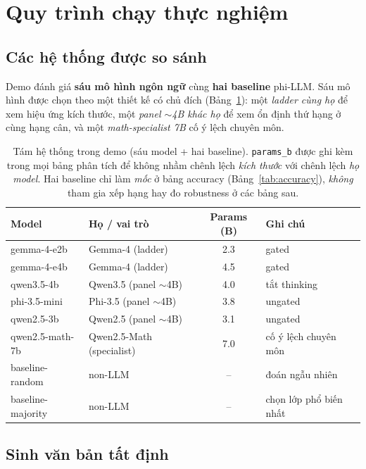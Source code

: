 \section{Quy trình chạy thực nghiệm}
\label{sec:protocol}

\subsection{Các hệ thống được so sánh}

Demo đánh giá \textbf{sáu mô hình ngôn ngữ} cùng \textbf{hai baseline} phi-LLM. Sáu
mô hình được chọn theo một thiết kế có chủ đích (Bảng~\ref{tab:systems}): một
\emph{ladder cùng họ} để xem hiệu ứng kích thước, một \emph{panel $\sim$4B khác họ}
để xem ổn định thứ hạng ở cùng hạng cân, và một \emph{math-specialist 7B} cố ý lệch
chuyên môn.

\begin{table}[t]
\centering
\caption{Tám hệ thống trong demo (sáu model + hai baseline). \texttt{params\_b} được
ghi kèm trong mọi bảng phân tích để không nhầm chênh lệch \emph{kích thước} với chênh
lệch \emph{họ model}. Hai baseline chỉ làm \emph{mốc} ở bảng accuracy
(Bảng~\ref{tab:accuracy}), \emph{không} tham gia xếp hạng hay đo robustness ở các
bảng sau.}
\label{tab:systems}
\small
\begin{tabular}{llcl}
\hline
\textbf{Model} & \textbf{Họ / vai trò} & \textbf{Params (B)} & \textbf{Ghi chú} \\
\hline
gemma-4-e2b      & Gemma-4 (ladder)        & 2.3 & gated \\
gemma-4-e4b      & Gemma-4 (ladder)        & 4.5 & gated \\
qwen3.5-4b       & Qwen3.5 (panel $\sim$4B) & 4.0 & tắt thinking \\
phi-3.5-mini     & Phi-3.5 (panel $\sim$4B) & 3.8 & ungated \\
qwen2.5-3b       & Qwen2.5 (panel $\sim$4B) & 3.1 & ungated \\
qwen2.5-math-7b  & Qwen2.5-Math (specialist) & 7.0 & cố ý lệch chuyên môn \\
\hline
baseline-random   & non-LLM & -- & đoán ngẫu nhiên \\
baseline-majority & non-LLM & -- & chọn lớp phổ biến nhất \\
\hline
\end{tabular}
\end{table}

\subsection{Sinh văn bản tất định}

